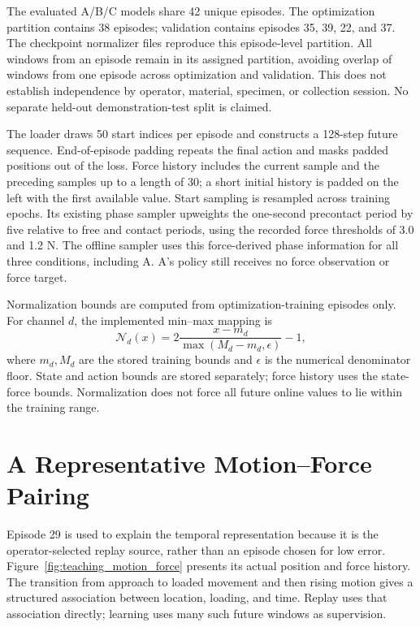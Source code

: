 The evaluated A/B/C models share 42 unique episodes. The optimization partition contains 38 episodes; validation contains episodes 35, 39, 22, and 37. The checkpoint normalizer files reproduce this episode-level partition. All windows from an episode remain in its assigned partition, avoiding overlap of windows from one episode across optimization and validation. This does not establish independence by operator, material, specimen, or collection session. No separate held-out demonstration-test split is claimed.


The loader draws 50 start indices per episode and constructs a 128-step future sequence. End-of-episode padding repeats the final action and masks padded positions out of the loss. Force history includes the current sample and the preceding samples up to a length of 30; a short initial history is padded on the left with the first available value. Start sampling is resampled across training epochs. Its existing phase sampler upweights the one-second precontact period by five relative to free and contact periods, using the recorded force thresholds of 3.0 and 1.2 N. The offline sampler uses this force-derived phase information for all three conditions, including A. A's policy still receives no force observation or force target.

Normalization bounds are computed from optimization-training episodes only. For channel \(d\), the implemented min--max mapping is
\begin{equation}
 \mathcal N_d(x)=2\frac{x-m_d}{\max(M_d-m_d,\epsilon)}-1,
 \label{eq:minmax_normalization}
\end{equation}
where \(m_d,M_d\) are the stored training bounds and \(\epsilon\) is the numerical denominator floor. State and action bounds are stored separately; force history uses the state-force bounds. Normalization does not force all future online values to lie within the training range.

\section{A Representative Motion--Force Pairing}
Episode 29 is used to explain the temporal representation because it is the operator-selected replay source, rather than an episode chosen for low error. Figure~\ref{fig:teaching_motion_force} presents its actual position and force history. The transition from approach to loaded movement and then rising motion gives a structured association between location, loading, and time. Replay uses that association directly; learning uses many such future windows as supervision.

